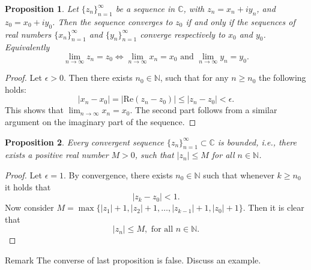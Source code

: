 \documentclass{amsart}
\newtheorem{prop}{Proposition}
\begin{document}
\begin{prop}
Let \(\{z_n\}_{n=1}^{\infty}\) be a sequence in \(\mathbb{C}\), with \(z_n = x_n + i y_n\), and \(z_0 = x_0 + iy_0\). Then 
the sequence converges to \(z_0\) if and only if the sequences of real numbers \(\{x_n\}_{n=1}^{\infty}\) and \(\{y_n\}_{n=1}^{\infty}\) converge respectively to \(x_0\) and \(y_0\). Equivalently
\[ \lim_{n\to\infty}z_n = z_0 \iff \lim_{n\to\infty}x_n = x_0 \mbox{ and } \lim_{n\to\infty}y_n = y_0. \]
\end{prop}
\begin{proof}
Let \(\epsilon >0\). Then there exists \(n_0 \in \mathbb{N}\), such that for any \(n\geq n_0\) the following holds:
\[ |x_n - x_0 | = | \mbox{Re}(z_n - z_0) | \leq |z_n - z_0 | < \epsilon. \]
This shows that \(\lim_{n\to \infty} x_n = x_0\). The second part follows from a similar argument on the imaginary part of the sequence.
\end{proof}

\begin{prop}
Every convergent sequence \(\{z_n\}_{n=1}^{\infty} \subset \mathbb{C}\) is bounded, i.e., there exists
a positive real number \(M>0\), such that \(|z_n| \leq M\) for all \(n\in\mathbb{N}\).
\end{prop}
\begin{proof}
Let \(\epsilon = 1\). By convergence, there exists \(n_0\in \mathbb{N}\) such that whenever \(k\geq n_0\) it holds that 
\[ |z_k - z_0 | < 1. \]
Now consider \(M = \max\{ |z_1| + 1, |z_2| + 1, \ldots, |z_{k-1}| + 1, |z_0| + 1\}\). Then it is clear that \[ |z_n| \leq M, \mbox{ for all } n \in \mathbb{N}. \]
\end{proof}

\alert{Remark} The converse of last proposition is false. Discuss an example.
\end{document}
